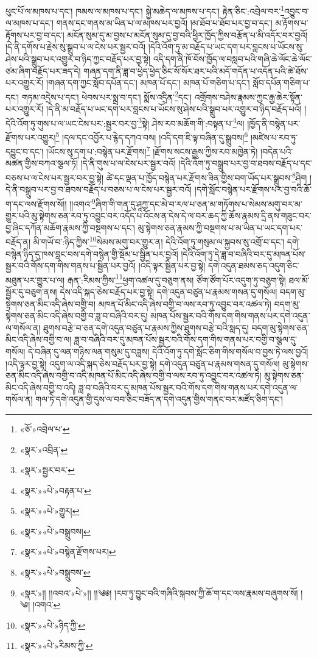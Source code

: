 ཕུང་པོ་ལ་མཁས་པ་དང་། ཁམས་ལ་མཁས་པ་དང་། སྐྱེ་མཆེད་ལ་མཁས་པ་དང་། རྟེན་ཅིང་:འབྲེལ་བར་\footnote{«ཅོ་»འབྲེལ་པ་}འབྱུང་བ་ལ་མཁས་པ་དང་། གནས་དང་གནས་མ་ཡིན་པ་ལ་མཁས་པར་བྱའོ། །མ་ཐོབ་པ་ཐོབ་པར་བྱ་བ་དང་། མ་རྟོགས་པ་རྟོགས་པར་བྱ་བ་དང་། མངོན་སུམ་དུ་མ་བྱས་པ་མངོན་སུམ་དུ་བྱ་བའི་ཕྱིར་ཁྱོད་ཀྱིས་བརྩོན་པ་མི་འདོར་བར་བྱའོ། །དེ་ནི་དགོས་པ་རྗེས་སུ་སྒྲུབ་པ་ལ་ངེས་པར་སྦྱར་བའོ། །དེའི་འོག་ཏུ་མ་བརྗོད་པ་ཡང་དག་པར་བླངས་པ་ཡོངས་སུ་ཤེས་པའི་སྒྲུབ་པར་འགྱུར་བ་ཉིད་ཀྱང་བརྗོད་པར་བྱ་སྟེ། འདི་དག་ནི་ཁོ་བོས་ཁྱོད་ལ་བསླབ་པའི་གཞི་ཆེ་ལོང་ཆེ་ལོང་ཙམ་ཞིག་བརྗོད་པར་ཟད་དེ། གཞན་དག་ནི་ཟླ་བ་ཕྱེད་ཕྱེད་ཅིང་སོ་སོར་ཐར་པའི་མདོ་གདོན་པ་འདོན་པའི་ཚེ་ཐོས་པར་འགྱུར་རོ། །གཞན་དག་ཀྱང་སློབ་དཔོན་དང་། མཁན་པོ་དང་། མཁན་པོ་གཅིག་པ་དང་། སློབ་དཔོན་གཅིག་པ་དང་། གཏམ་འདྲེས་པ་དང་། ཕེབས་པར་སྨྲ་བ་དང་། སྨོས་འདྲིན་\footnote{«སྣར་»འབྲིན་}དང་། འགྲོགས་བཤེས་རྣམས་ཀྱང་རྒྱ་ཆེར་སྟོན་པར་འགྱུར་རོ། །དེ་ནི་མ་བརྗོད་པ་ཡང་དག་པར་བླངས་པ་ཡོངས་སུ་ཤེས་པའི་སྒྲུབ་པར་འགྱུར་བ་ཉིད་བརྗོད་པའོ། །དེའི་འོག་ཏུ་གུས་པ་ལ་ཡང་ངེས་པར་:སྦྱར་བར་བྱ་\footnote{«སྣར་»སྦྱར་བར་}སྟེ། ཤེས་རབ་མཆོག་གི་:བསྟན་པ་\footnote{«སྣར་»«པེ་»བརྟན་པ་}ལ། །ཁྱོད་ནི་བསྙེན་པར་རྫོགས་པར་འགྱུར།\footnote{«སྣར་»«པེ་»གྱུར།} །དལ་དང་འབྱོར་པ་རྙེད་དཀའ་བས། །འདི་དག་ཇི་ལྟ་བཞིན་དུ་སྒྲུབས།\footnote{«སྣར་»«པེ་»བསྒྲུབས།} །མཛེས་པ་རབ་ཏུ་དབྱུང་བ་དང་། །ཡོངས་སུ་དག་པ་:བསྙེན་པར་རྫོགས།\footnote{«སྣར་»«པེ་»བསྙེན་རྫོགས་པར།} །རྫོགས་སངས་རྒྱས་ཀྱིས་རབ་མཁྱེན་ཏེ། །བདེན་པའི་མཚན་གྱིས་བཀའ་སྩལ་ཏོ། །དེ་ནི་གུས་པ་ལ་ངེས་པར་སྦྱར་བའོ། །དེའི་འོག་ཏུ་བསྒྲུབ་པར་བྱ་བ་ཐབས་བརྗོད་པ་དང་བཅས་པ་ལ་ངེས་པར་སྦྱར་བར་བྱ་སྟེ། ཚེ་དང་ལྡན་པ་ཁྱོད་བསྙེན་པར་རྫོགས་ཟིན་གྱིས་བག་ཡོད་པར་སྒྲུབས་\footnote{«སྣར་»«པེ་»བསྒྲུབས་}ཤིག །དེ་ནི་བསྒྲུབ་པར་བྱ་བ་ཐབས་བརྗོད་པ་བཅས་པ་ལ་ངེས་པར་སྦྱར་བའོ། །དགེ་སློང་བསྙེན་པར་རྫོགས་པར་བྱ་བའི་ཆོ་ག་དང་ལས་རྫོགས་སོ།། །།འགའ་\footnote{«སྣར་»།། །།འབའ་«པེ་»།། །།༄༅། །རབ་ཏུ་བྱུང་བའི་གཞིའི་སྐབས་ཀྱི་ཆོ་ག་དང་ལས་རྣམས་བཞུགས་སོ། ། ༄། །འགའ་}ཞིག་གི་གན་དུ་ཤཱཀྱ་དང་མེ་བ་རལ་པ་ཅན་མ་གཏོགས་པ་སེམས་མགུ་བར་མ་གྱུར་པའི་མུ་སྟེགས་ཅན་རབ་ཏུ་འབྱུང་བར་འདོད་པ་འོངས་ན་དེས་དེ་ལ་བར་ཆད་ཀྱི་ཆོས་རྣམས་དྲི་ནས་གཟུང་བར་བྱ་ཞིང་དཀོན་མཆོག་རྣམས་ཀྱི་བསྔགས་པ་དང་། མུ་སྟེགས་ཅན་རྣམས་ཀྱི་བསྔགས་པ་མ་ཡིན་པ་ཡང་དག་པར་བརྗོད་ན། མི་གཡོ་བ་:ཉིད་ཀྱིས་\footnote{«སྣར་»«པེ་»ཉིད་ཀྱི་}སེམས་མགུ་བར་གྱུར་ན། དེའི་འོག་ཏུ་གསུམ་ལ་སྐྱབས་སུ་འགྲོ་བ་དང་། དགེ་བསྙེན་ཉིད་དུ་ཁས་བླང་བས་དགེ་བསྙེན་གྱི་སྡོམ་པ་སྦྱིན་པར་བྱའོ། །དེའི་འོག་ཏུ་དེ་ཟླ་བ་བཞིའི་བར་དུ་མཁན་པོས་སྦྱར་བའི་གོས་དག་གིས་གནས་པ་སྦྱིན་པར་བྱའོ། །འདི་ལྟར་སྦྱིན་པར་བྱ་སྟེ། དགེ་འདུན་ཐམས་ཅད་འདུག་ཅིང་མཐུན་པར་གྱུར་པ་ལ། རྒན་:རིམས་ཀྱིས་\footnote{«སྣར་»«པེ་»རིམས་ཀྱི་}ཕྱག་འཚལ་དུ་བཅུག་ནས། ཙོག་ཙོག་པོར་འདུག་ཏུ་བཅུག་སྟེ། ཐལ་མོ་སྦྱོར་དུ་བཅུག་ནས། དེས་འདི་སྐད་ཅེས་བརྗོད་པར་བྱ་སྟེ། དགེ་འདུན་བཙུན་པ་རྣམས་གསན་དུ་གསོལ། བདག་མུ་སྟེགས་ཅན་མིང་འདི་ཞེས་བགྱི་བ། མཁན་པོ་མིང་འདི་ཞེས་བགྱི་བ་ལས་རབ་ཏུ་འབྱུང་བར་འཚལ་ཏེ། བདག་མུ་སྟེགས་ཅན་མིང་འདི་ཞེས་བགྱི་བ་ཟླ་བ་བཞིའི་བར་དུ། མཁན་པོས་སྦྱར་བའི་གོས་དག་གིས་གནས་པར་དགེ་འདུན་ལ་གསོལ་ན། ཐུགས་བརྩེ་བ་ཅན་དགེ་འདུན་བཙུན་པ་རྣམས་ཀྱིས་ཐུགས་བརྩེ་བའི་སླད་དུ། བདག་མུ་སྟེགས་ཅན་མིང་འདི་ཞེས་བགྱི་བ་ལ། ཟླ་བ་བཞིའི་བར་དུ་མཁན་པོས་སྦྱར་བའི་གོས་དག་གིས་གནས་པར་བགྱི་བ་སྩལ་དུ་གསོལ། དེ་བཞིན་དུ་ལན་གཉིས་ལན་གསུམ་དུ་བཟླས། དེའི་འོག་ཏུ་དགེ་སློང་ཅིག་གིས་གསོལ་བ་བྱས་ཏེ་ལས་བྱའོ། །འདི་ལྟར་བྱ་སྟེ། འདུག་ལ་འདི་སྐད་ཅེས་བརྗོད་པར་བྱ་སྟེ། དགེ་འདུན་བཙུན་པ་རྣམས་གསན་དུ་གསོལ། མུ་སྟེགས་ཅན་མིང་འདི་ཞེས་བགྱི་བ་འདི་མཁན་པོ་མིང་འདི་ཞེས་བགྱི་བ་ལས་རབ་ཏུ་འབྱུང་བར་འཚལ་ཏེ། མུ་སྟེགས་ཅན་མིང་འདི་ཞེས་བགྱི་བ་འདི། ཟླ་བ་བཞིའི་བར་དུ་མཁན་པོས་སྦྱར་བའི་གོས་དག་གིས་གནས་པར་དགེ་འདུན་ལ་གསོལ་ན། གལ་ཏེ་དགེ་འདུན་གྱི་དུས་ལ་བབ་ཅིང་བཟོད་ན་དགེ་འདུན་གྱིས་གནང་བར་མཛོད་ཅིག་དང་། 